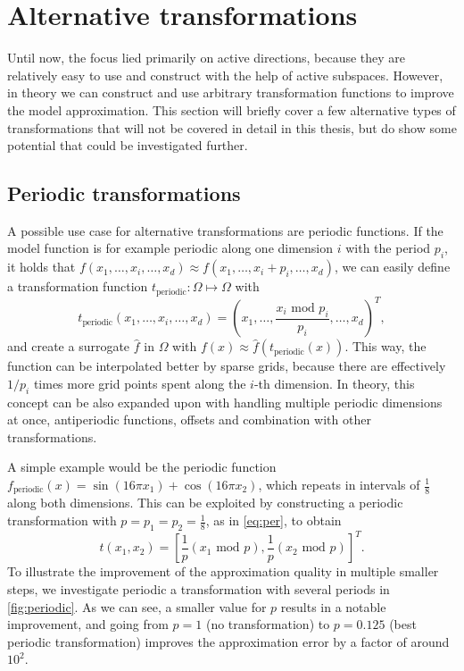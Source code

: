 \documentclass[
  a4paper,  %
  twoside,  %
  bibliography=totoc,
  headsepline,
  cleardoublepage=empty,
  parskip=half,
  draft=false
]{scrbook}
\begin{document}
\section{Alternative transformations}

Until now, the focus lied primarily on active directions, because they are relatively easy to use and construct with the help of active subspaces.
However, in theory we can construct and use arbitrary transformation functions to improve the model approximation.
This section will briefly cover a few alternative types of transformations that will not be covered in detail in this thesis, but do show some potential that could be investigated further.

\subsection{Periodic transformations}

A possible use case for alternative transformations are periodic functions.
If the model function is for example periodic along one dimension $i$ with the period $p_i$, \ie it holds that $f(x_1,\dots,x_i,\dots,x_d) \approx f(x_1,\dots,x_i + p_i, \dots,x_d)$, we can easily define a transformation function $t_{\text{periodic}} \colon \Omega \mapsto \Omega$ with
\begin{equation}
t_{\text{periodic}}(x_1,\dots,x_i,\dots,x_d) = (x_1,\dots, \frac{x_i\text{ mod } p_i}{p_i}, \dots,x_d)^T,
\label{eq:per}
\end{equation}
and create a surrogate $\hat{f}$ in $\Omega$ with $f(x) \approx \hat{f}(t_{\text{periodic}}(x))$.
This way, the function can be interpolated better by sparse grids, because there are effectively $1 / p_i$ times more grid points spent along the $i$-th dimension.
In theory, this concept can be also expanded upon with handling multiple periodic dimensions at once, antiperiodic functions, offsets and combination with other transformations.

A simple example would be the periodic function $f_{\text{periodic}}(x)=\sin(16\pi x_1)  + \cos(16\pi x_2)$, which repeats in intervals of $\frac{1}{8}$ along both dimensions.
This can be exploited by constructing a periodic transformation with $p=p_1=p_2=\frac{1}{8}$, as in \cref{eq:per}, to obtain
\begin{equation}
t(x_1,x_2) = \left[\frac{1}{p} \left(x_1 \text{ mod } p\right), \frac{1}{p} \left(x_2 \text{ mod } p\right)\right]^T.
\end{equation}
%
To illustrate the improvement of the approximation quality in multiple smaller steps, we investigate periodic a transformation with several periods in \cref{fig:periodic}.
As we can see, a smaller value for $p$ results in a notable improvement, and going from $p=1$ (no transformation) to $p=0.125$ (best periodic transformation) improves the approximation error by a factor of around $10^2$.
\end{document}

